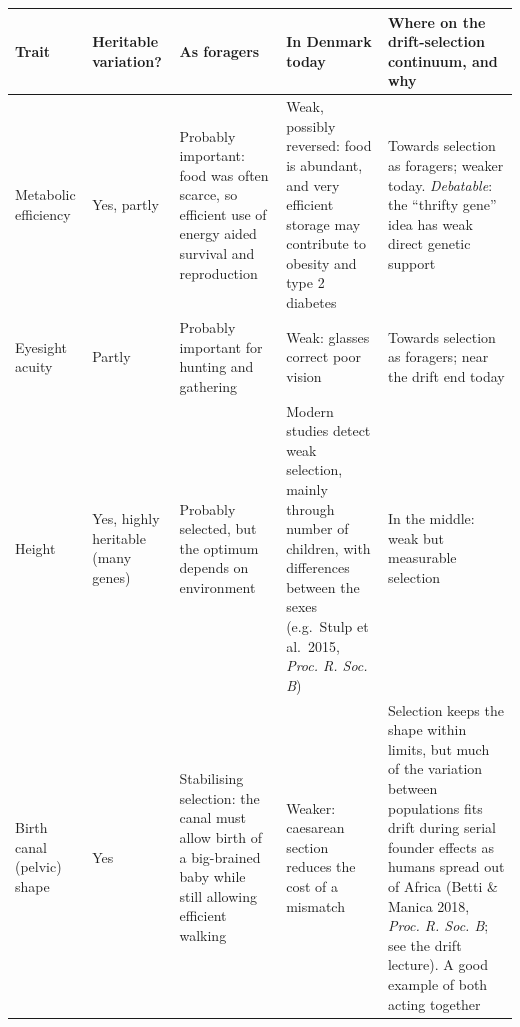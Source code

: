 \documentclass[
  a4paper]{book}
\newcounter{none} %
\begin{document}
{\def\LTcaptype{none} %
\begin{longtable}[]{@{}
  >{\raggedright\arraybackslash}p{}
  >{\raggedright\arraybackslash}p{}
  >{\raggedright\arraybackslash}p{}
  >{\raggedright\arraybackslash}p{}
  >{\raggedright\arraybackslash}p{}@{}}
\toprule\noalign{}
\begin{minipage}[b]{\linewidth}\raggedright
Trait
\end{minipage} & \begin{minipage}[b]{\linewidth}\raggedright
Heritable variation?
\end{minipage} & \begin{minipage}[b]{\linewidth}\raggedright
As foragers
\end{minipage} & \begin{minipage}[b]{\linewidth}\raggedright
In Denmark today
\end{minipage} & \begin{minipage}[b]{\linewidth}\raggedright
Where on the drift-selection continuum, and why
\end{minipage} \\
\midrule\noalign{}
\endhead
\bottomrule\noalign{}
\endlastfoot
Metabolic efficiency & Yes, partly & Probably important: food was often scarce, so efficient use of energy aided survival and reproduction & Weak, possibly reversed: food is abundant, and very efficient storage may contribute to obesity and type 2 diabetes & Towards selection as foragers; weaker today. \emph{Debatable}: the ``thrifty gene'' idea has weak direct genetic support \\
Eyesight acuity & Partly & Probably important for hunting and gathering & Weak: glasses correct poor vision & Towards selection as foragers; near the drift end today \\
Height & Yes, highly heritable (many genes) & Probably selected, but the optimum depends on environment & Modern studies detect weak selection, mainly through number of children, with differences between the sexes (e.g.~Stulp et al.~2015, \emph{Proc. R. Soc. B}) & In the middle: weak but measurable selection \\
Birth canal (pelvic) shape & Yes & Stabilising selection: the canal must allow birth of a big-brained baby while still allowing efficient walking & Weaker: caesarean section reduces the cost of a mismatch & Selection keeps the shape within limits, but much of the variation between populations fits drift during serial founder effects as humans spread out of Africa (Betti \& Manica 2018, \emph{Proc. R. Soc. B}; see the drift lecture). A good example of both acting together \\

\end{longtable}}
\end{document}
